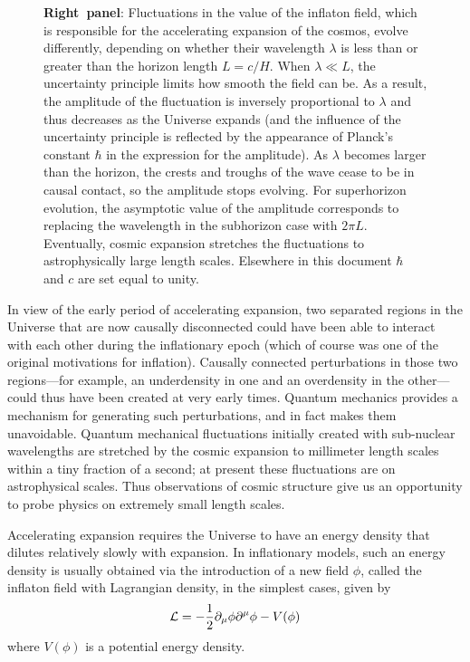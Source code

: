\begin{figure}[ht]
{\mbox{\bf Right panel}: Fluctuations in the value of the inflaton field, which is responsible for the accelerating expansion of the cosmos, evolve differently, depending on whether their wavelength $\lambda$ is less than or greater than the horizon length $L = c/H$. When $\lambda \ll L$, the uncertainty principle limits how smooth the field can be. As a result, the amplitude of the fluctuation is inversely proportional to $\lambda$ and thus decreases as the Universe expands (and the influence of the uncertainty principle is reflected by the appearance of Planck's constant $\hbar$ in the expression for the amplitude). As $\lambda$ becomes larger than the horizon, the crests and troughs of the wave cease to be in causal contact, so the amplitude stops evolving. For superhorizon evolution, the asymptotic value of the amplitude corresponds to replacing the wavelength in the subhorizon case with $2\pi L$. Eventually, cosmic expansion stretches the fluctuations to astrophysically large length scales. Elsewhere in this document $\hbar$ and $c$ are set equal to unity. 
}
\label{fig:PTfigs}
\end{figure}


In view of the early period of accelerating expansion, two separated regions in the Universe that are now causally disconnected could have been able to interact with each other during the inflationary epoch (which of course was one of the original motivations for inflation). Causally connected perturbations in those two regions---for example, an underdensity in one and an overdensity in the other---could thus have been created at very early times. Quantum mechanics provides a mechanism for generating such perturbations, and in fact makes them unavoidable. Quantum mechanical fluctuations initially created with sub-nuclear wavelengths are stretched by the cosmic expansion to millimeter length scales within a tiny fraction of a second; at present these fluctuations are on astrophysical scales. Thus observations of cosmic structure give us an opportunity to probe physics on extremely small length scales.

Accelerating expansion requires the Universe to have an energy density that dilutes relatively slowly with expansion. In inflationary models, such an energy density is usually obtained via the introduction of a new field $\phi$, called the inflaton field with Lagrangian density, in the simplest cases, given by
\begin{equation}
{\cal L} = - \frac{1}{2} \partial_\mu \phi \partial^\mu \phi - V(\phi)
\end{equation}
where $V(\phi)$ is a potential energy density. 

